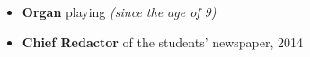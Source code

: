 
\begin{itemize}[leftmargin=1em]
  \itemsep0pt  \parskip0pt
\item \textbf{Organ} playing \textsl{(since the age of 9)}
\item \textbf{Chief Redactor} of the students' newspaper, 2014
\end{itemize}

